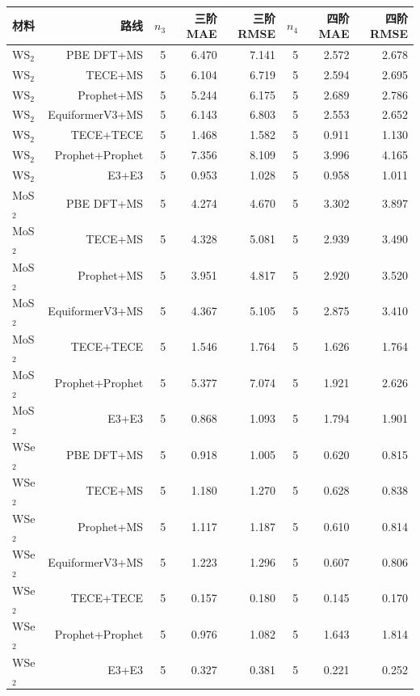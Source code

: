 \begin{tabular}{lrrrrrrr}
\toprule
材料 & 路线 & $n_3$ & 三阶 MAE & 三阶 RMSE & $n_4$ & 四阶 MAE & 四阶 RMSE \\
\midrule
WS$_2$ & PBE DFT+MS & 5 & 6.470 & 7.141 & 5 & 2.572 & 2.678 \\
WS$_2$ & TECE+MS & 5 & 6.104 & 6.719 & 5 & 2.594 & 2.695 \\
WS$_2$ & Prophet+MS & 5 & 5.244 & 6.175 & 5 & 2.689 & 2.786 \\
WS$_2$ & EquiformerV3+MS & 5 & 6.143 & 6.803 & 5 & 2.553 & 2.652 \\
WS$_2$ & TECE+TECE & 5 & 1.468 & 1.582 & 5 & 0.911 & 1.130 \\
WS$_2$ & Prophet+Prophet & 5 & 7.356 & 8.109 & 5 & 3.996 & 4.165 \\
WS$_2$ & E3+E3 & 5 & 0.953 & 1.028 & 5 & 0.958 & 1.011 \\
MoS$_2$ & PBE DFT+MS & 5 & 4.274 & 4.670 & 5 & 3.302 & 3.897 \\
MoS$_2$ & TECE+MS & 5 & 4.328 & 5.081 & 5 & 2.939 & 3.490 \\
MoS$_2$ & Prophet+MS & 5 & 3.951 & 4.817 & 5 & 2.920 & 3.520 \\
MoS$_2$ & EquiformerV3+MS & 5 & 4.367 & 5.105 & 5 & 2.875 & 3.410 \\
MoS$_2$ & TECE+TECE & 5 & 1.546 & 1.764 & 5 & 1.626 & 1.764 \\
MoS$_2$ & Prophet+Prophet & 5 & 5.377 & 7.074 & 5 & 1.921 & 2.626 \\
MoS$_2$ & E3+E3 & 5 & 0.868 & 1.093 & 5 & 1.794 & 1.901 \\
WSe$_2$ & PBE DFT+MS & 5 & 0.918 & 1.005 & 5 & 0.620 & 0.815 \\
WSe$_2$ & TECE+MS & 5 & 1.180 & 1.270 & 5 & 0.628 & 0.838 \\
WSe$_2$ & Prophet+MS & 5 & 1.117 & 1.187 & 5 & 0.610 & 0.814 \\
WSe$_2$ & EquiformerV3+MS & 5 & 1.223 & 1.296 & 5 & 0.607 & 0.806 \\
WSe$_2$ & TECE+TECE & 5 & 0.157 & 0.180 & 5 & 0.145 & 0.170 \\
WSe$_2$ & Prophet+Prophet & 5 & 0.976 & 1.082 & 5 & 1.643 & 1.814 \\
WSe$_2$ & E3+E3 & 5 & 0.327 & 0.381 & 5 & 0.221 & 0.252 \\
\bottomrule
\end{tabular}
